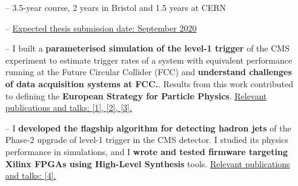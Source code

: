 \documentclass[10pt,a4paper]{altacv}
\begin{document}

%

\begin{fullwidth}
\makecvheader
\end{fullwidth}

%





\begin{itemize}
    \setlength{\itemindent}{0.5em}
    \item[--]   \small{3.5-year course, 2 years in Bristol and 1.5 years at CERN}
    \item[--]   \small{\underline{Expected thesis submission date: September 2020}}
    \item[--]   \small{I built a \textbf{parameterised simulation of the level-1 trigger} of the CMS experiment to estimate trigger rates of a system with equivalent performance running at the Future Circular Collider (FCC) and \textbf{understand challenges of data acquisition systems at FCC.}}. Results from this work contributed to defining the \textbf{European Strategy for Particle Physics}.
    \underline{Relevant publications and talks: [1], [2], [3].}
    \item[--]   \small{I \textbf{developed the flagship algorithm for detecting hadron jets} of the Phase-2 upgrade of level-1 trigger in the CMS detector. I studied its physics performance in simulations, and I \textbf{wrote and tested firmware targeting Xilinx FPGAs using High-Level Synthesis} tools.}
    \underline{Relevant publications and talks: [4].}
\end{itemize}

\medskip


\end{document}
